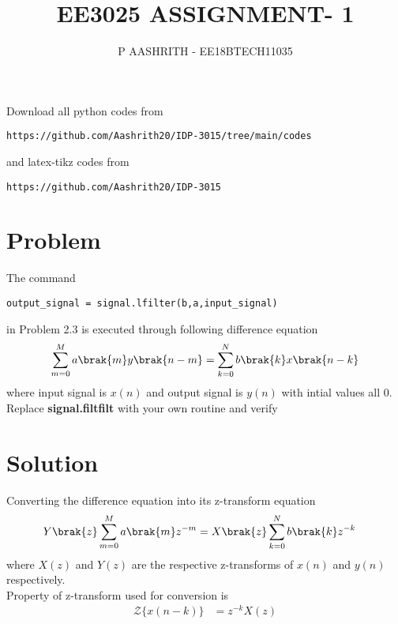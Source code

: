 \documentclass[journal,12pt,twocolumn]{IEEEtran}
\begin{document}
     \def\rightbox#1{\makebox[0in][r]{#1}}
     \def\centbox#1{\makebox[0in]{#1}}
     \def\topbox#1{\raisebox{-\baselineskip}[0in][0in]{#1}}
     \def\midbox#1{\raisebox{-0.5\baselineskip}[0in][0in]{#1}}
\vspace{3cm}
\title{EE3025 ASSIGNMENT- 1}
\author{P AASHRITH - EE18BTECH11035}
\maketitle
\newpage
\bigskip
\renewcommand{\thefigure}{\theenumi}
\renewcommand{\thetable}{\theenumi}
Download all python codes from 
\begin{lstlisting}
https://github.com/Aashrith20/IDP-3015/tree/main/codes
\end{lstlisting}
%
and latex-tikz codes from 
%
\begin{lstlisting}
https://github.com/Aashrith20/IDP-3015
\end{lstlisting}

\section{Problem}

    
The command
\begin{lstlisting}
output_signal = signal.lfilter(b,a,input_signal)
\end{lstlisting}

in Problem 2.3 is executed through following difference equation 
    \begin{align}
        \sum _{m=0}^{M}a\brak{m}y\brak{n-m}=\sum _{k=0}^{N}b\brak{k}x\brak{n-k}
    \end{align}
 where input signal is $x(n)$ and output signal is $y(n)$ with intial values all 0. Replace \textbf{signal.filtfilt} with your own routine and verify
\section{Solution}

Converting the difference equation into its z-transform equation
\begin{align}
     Y\brak{z} \sum _{m=0}^{M}a\brak{m} z^{-m} &= X\brak{z} \sum _{k=0}^{N}b\brak{k}z^{-k}
     \label{eq:eq1}
\end{align}
where $X(z)$ and $Y(z)$ are the respective z-transforms of $x(n)$ and $y(n)$ respectively.\\
Property of z-transform used for conversion is
\begin{align}
  {\mathcal {Z}}\{x(n-k)\} &= z^{-k}X(z) 
\end{align}
  
\end{document}

